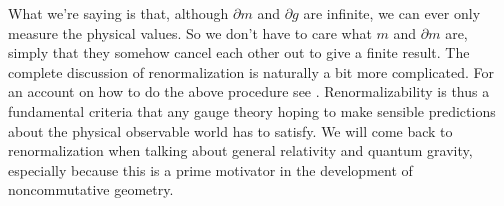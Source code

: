 What we're saying is that, although $\partial m$ and $\partial g$ are infinite, we can ever only measure the physical values. So we don't have to care what $m$ and $\partial m$ are, simply that they somehow cancel each other out to give a finite result. The complete discussion of renormalization is naturally a bit more complicated. For an account on how to do the above procedure see \cite{sakurai1967aqm}. Renormalizability is thus a fundamental criteria that any gauge theory hoping to make sensible predictions about the physical observable world has to satisfy. We will come back to renormalization when talking about general relativity and quantum gravity, especially because this is a prime motivator in the development of noncommutative geometry.
